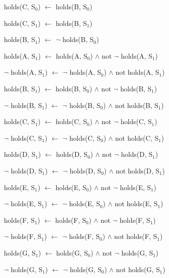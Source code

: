 \documentclass[a4paper]{article}
\begin{document}
        \begin{list}{}{Constraint}
          \item holds(C, S$_{0}$) $\leftarrow$ holds(B, S$_{0}$)
          \item holds(C, S$_{1}$) $\leftarrow$ holds(B, S$_{1}$)
        \end{list}

        \begin{list}{}{Transformation}
          \item holds(B, S$_{1}$) $\leftarrow$ $\lnot$ holds(B, S$_{0}$)
        \end{list}

        \begin{list}{}{Inertial Rules}
          \item
            holds(A, S$_{1}$) $\leftarrow$ holds(A, S$_{0}$) $\land$ not
            $\lnot$ holds(A, S$_{1}$)
          \item
            $\lnot$ holds(A, S$_{1}$) $\leftarrow$ $\lnot$ holds(A, S$_{0}$) 
            $\land$ not holds(A, S$_{1}$)
          \item
            holds(B, S$_{1}$) $\leftarrow$ holds(B, S$_{0}$) $\land$ not
            $\lnot$ holds(B, S$_{1}$)
          \item
            $\lnot$ holds(B, S$_{1}$) $\leftarrow$ $\lnot$ holds(B, S$_{0}$) 
            $\land$ not holds(B, S$_{1}$)
          \item
            holds(C, S$_{1}$) $\leftarrow$ holds(C, S$_{0}$) $\land$ not
            $\lnot$ holds(C, S$_{1}$)
          \item
            $\lnot$ holds(C, S$_{1}$) $\leftarrow$ $\lnot$ holds(C, S$_{0}$)
            $\land$ not holds(C, S$_{1}$)
          \item
            holds(D, S$_{1}$) $\leftarrow$ holds(D, S$_{0}$) $\land$ not
            $\lnot$ holds(D, S$_{1}$)
          \item
            $\lnot$ holds(D, S$_{1}$) $\leftarrow$ $\lnot$ holds(D, S$_{0}$)
            $\land$ not holds(D, S$_{1}$)
          \item
            holds(E, S$_{1}$) $\leftarrow$ holds(E, S$_{0}$) $\land$ not
            $\lnot$ holds(E, S$_{1}$)
          \item
            $\lnot$ holds(E, S$_{1}$) $\leftarrow$ $\lnot$ holds(E, S$_{0}$)
            $\land$ not holds(E, S$_{1}$)
          \item
            holds(F, S$_{1}$) $\leftarrow$ holds(F, S$_{0}$) $\land$ not
            $\lnot$ holds(F, S$_{1}$)
          \item
            $\lnot$ holds(F, S$_{1}$) $\leftarrow$ $\lnot$ holds(F, S$_{0}$)
            $\land$ not holds(F, S$_{1}$)
          \item
            holds(G, S$_{1}$) $\leftarrow$ holds(G, S$_{0}$) $\land$ not
            $\lnot$ holds(G, S$_{1}$)
          \item
            $\lnot$ holds(G, S$_{1}$) $\leftarrow$ $\lnot$ holds(G, S$_{0}$)
            $\land$ not holds(G, S$_{1}$)

        \end{list}
\end{document}
